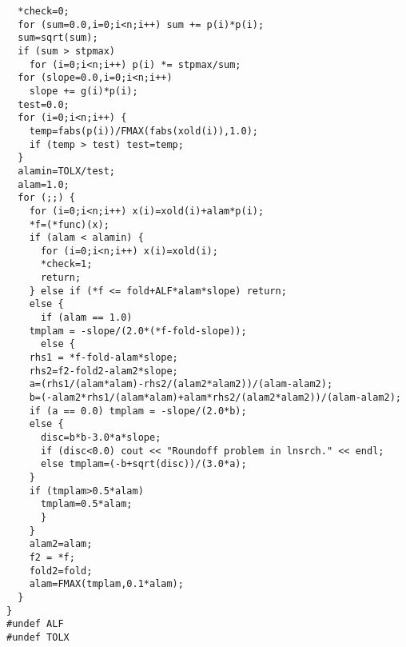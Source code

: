 \documentclass{beamer}
\begin{document}
\begin{frame}
\begin{block}{}
\begin{verbatim}
  *check=0;
  for (sum=0.0,i=0;i<n;i++) sum += p(i)*p(i);
  sum=sqrt(sum);
  if (sum > stpmax)
    for (i=0;i<n;i++) p(i) *= stpmax/sum;
  for (slope=0.0,i=0;i<n;i++)
    slope += g(i)*p(i);
  test=0.0;
  for (i=0;i<n;i++) {
    temp=fabs(p(i))/FMAX(fabs(xold(i)),1.0);
    if (temp > test) test=temp;
  }
  alamin=TOLX/test;
  alam=1.0;
  for (;;) {
    for (i=0;i<n;i++) x(i)=xold(i)+alam*p(i);
    *f=(*func)(x);
    if (alam < alamin) {
      for (i=0;i<n;i++) x(i)=xold(i);
      *check=1;
      return;
    } else if (*f <= fold+ALF*alam*slope) return;
    else {
      if (alam == 1.0)
	tmplam = -slope/(2.0*(*f-fold-slope));
      else {
	rhs1 = *f-fold-alam*slope;
	rhs2=f2-fold2-alam2*slope;
	a=(rhs1/(alam*alam)-rhs2/(alam2*alam2))/(alam-alam2);
	b=(-alam2*rhs1/(alam*alam)+alam*rhs2/(alam2*alam2))/(alam-alam2);
	if (a == 0.0) tmplam = -slope/(2.0*b);
	else {
	  disc=b*b-3.0*a*slope;
	  if (disc<0.0) cout << "Roundoff problem in lnsrch." << endl;
	  else tmplam=(-b+sqrt(disc))/(3.0*a);
	}
	if (tmplam>0.5*alam)
	  tmplam=0.5*alam;
      }
    }
    alam2=alam;
    f2 = *f;
    fold2=fold;
    alam=FMAX(tmplam,0.1*alam);
  }
}
#undef ALF
#undef TOLX


\end{verbatim}


\end{block}
\end{frame}
\end{document}

